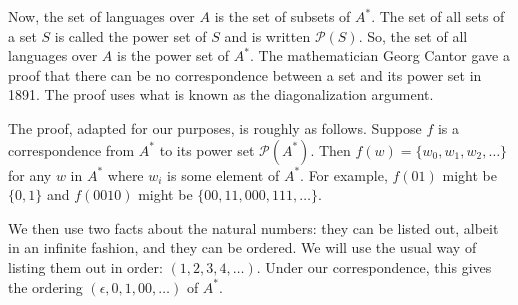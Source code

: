 \documentclass{iansnotes}
\begin{document}
  Now, the set of languages over $A$ is the set of subsets of $A^*$.
  The set of all sets of a set $S$ is called the power set of $S$ and is written $\mathcal{P}(S)$.
  So, the set of all languages over $A$ is the power set of $A^*$.
  The mathematician Georg Cantor gave a proof that there can be no correspondence between a set and its power set in 1891.
  The proof uses what is known as the diagonalization argument.

  The proof, adapted for our purposes, is roughly as follows.
  Suppose $f$ is a correspondence from $A^*$ to its power set $\mathcal{P}(A^*)$.
  Then $f(w) = \{w_0, w_1, w_2, \ldots\}$ for any $w$ in $A^*$ where $w_i$ is some element of $A^*$.
  For example, $f(01)$ might be $\{0,1\}$ and $f(0010)$ might be $\{00, 11, 000, 111, \ldots\}$.

  We then use two facts about the natural numbers: they can be listed out, albeit in an infinite fashion, and they can be ordered.
  We will use the usual way of listing them out in order: $(1, 2, 3, 4, \ldots)$.
  Under our correspondence, this gives the ordering $(\epsilon, 0, 1, 00, \ldots)$ of $A^*$.
  
\end{document}
